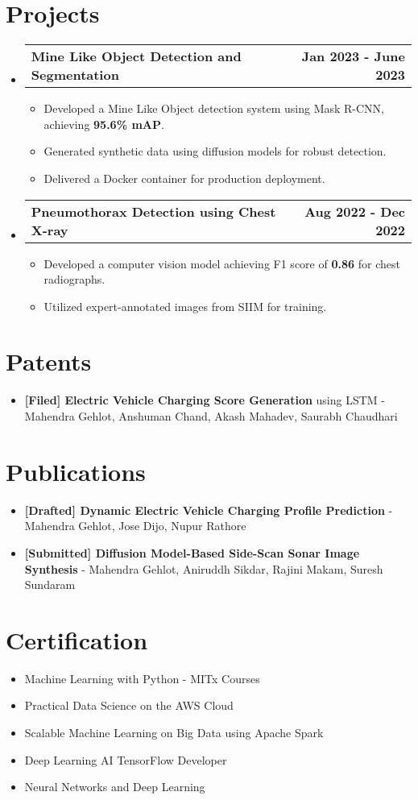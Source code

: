 \documentclass[letterpaper,11pt]{article}
\makeatletter
\newcommand{\resumeItem}[1]{
  \item\small{
    {#1 \vspace{-2pt}}
  }
}
\newcommand{\resumeProjectHeading}[2]{
    \item
    \begin{tabular*}{1.001\textwidth}{l@{\extracolsep{\fill}}r}
      \small#1 & \textbf{\small #2}\\
    \end{tabular*}\vspace{-7pt}
}
\newcommand{\resumeSubHeadingListStart}{\begin{itemize}[leftmargin=0.0in, label={}]}
\newcommand{\resumeSubHeadingListEnd}{\end{itemize}}
\newcommand{\resumeItemListStart}{\begin{itemize}}
\newcommand{\resumeItemListEnd}{\end{itemize}\vspace{-5pt}}
\makeatother
\begin{document}
\section{Projects}
    \resumeSubHeadingListStart
      \resumeProjectHeading
          {\textbf{Mine Like Object Detection and Segmentation}}{Jan 2023 - June 2023}
          \resumeItemListStart
            \resumeItem{Developed a Mine Like Object detection system using Mask R-CNN, achieving \textbf{95.6\% mAP}.}
            \resumeItem{Generated synthetic data using diffusion models for robust detection.}
            \resumeItem{Delivered a Docker container for production deployment.}
          \resumeItemListEnd
      \resumeProjectHeading
          {\textbf{Pneumothorax Detection using Chest X-ray}}{Aug 2022 - Dec 2022}
          \resumeItemListStart
            \resumeItem{Developed a computer vision model achieving F1 score of \textbf{0.86} for chest radiographs.}
            \resumeItem{Utilized expert-annotated images from SIIM for training.}
          \resumeItemListEnd     
    \resumeSubHeadingListEnd

\section{Patents}
\resumeItemListStart
\resumeItem{\textbf{[Filed] Electric Vehicle Charging Score Generation} using LSTM - Mahendra Gehlot, Anshuman Chand, Akash Mahadev, Saurabh Chaudhari}
\resumeItemListEnd

\section{Publications}
\resumeItemListStart
\resumeItem{\textbf{[Drafted] Dynamic Electric Vehicle Charging Profile Prediction} - Mahendra Gehlot, Jose Dijo, Nupur Rathore}
\resumeItem{\textbf{[Submitted] Diffusion Model-Based Side-Scan Sonar Image Synthesis} - Mahendra Gehlot, Aniruddh Sikdar, Rajini Makam, Suresh Sundaram}
\resumeItemListEnd

\section{Certification}
    \begin{multicols}{2}
            \begin{itemize}[itemsep=-5pt, parsep=8pt]
                \item Machine Learning with Python - MITx Courses
                \item Practical Data Science on the AWS Cloud
                \item Scalable Machine Learning on Big Data using Apache Spark
                \item Deep Learning AI TensorFlow Developer
                \item Neural Networks and Deep Learning  
            \end{itemize}
        \end{multicols}
        \vspace*{2.0\multicolsep}
\end{document}
